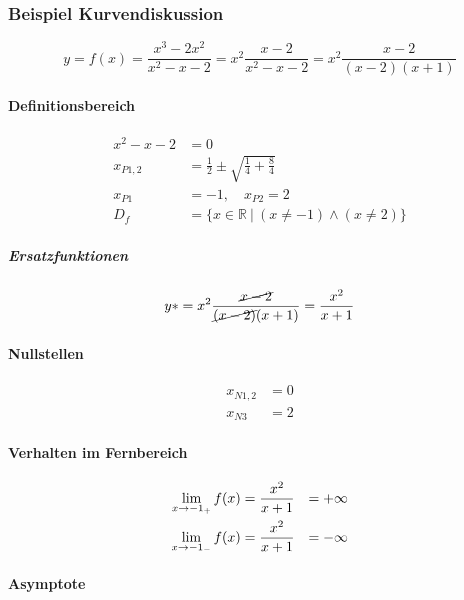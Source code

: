\subsubsection{Beispiel Kurvendiskussion}

\[
    y = f(x) = \frac{x^3 - 2x^2}{x^2 - x - 2} = x^2 \frac{x - 2}{x^2 - x - 2} = x^2 \frac{x - 2}{(x-2)(x+1)}
\]

\paragraph{Definitionsbereich}

\begin{align*}
    x^2 - x - 2 &= 0 \\
    x_{P1,2} &= \frac{1}{2} \pm \sqrt{\frac{1}{4} + \frac{8}{4}} \\
    x_{P1} &= -1,\quad x_{P2} = 2 \\
    D_f &= \{ x \in \mathbb{R}\ |\ (x \neq -1) \wedge (x \neq 2) \} 
\end{align*}

\subparagraph{Ersatzfunktionen}

\begin{align*}
    y* = x^2 \frac{\cancel{x - 2}}{\cancel{(x - 2)}(x + 1)} = \frac{x^2}{x + 1}
\end{align*}

\paragraph{Nullstellen}

\begin{align*}
    x_{N1,2} &= 0 \\
    x_{N3} &= 2
\end{align*}

\paragraph{Verhalten im Fernbereich}

\begin{alignat*}{2}
    \lim_{x \rightarrow -1_+} f(x) &= \frac{x^2}{x + 1} &= +\infty \\
    \lim_{x \rightarrow -1_-} f(x) &= \frac{x^2}{x + 1} &= -\infty
\end{alignat*}

\paragraph{Asymptote}

